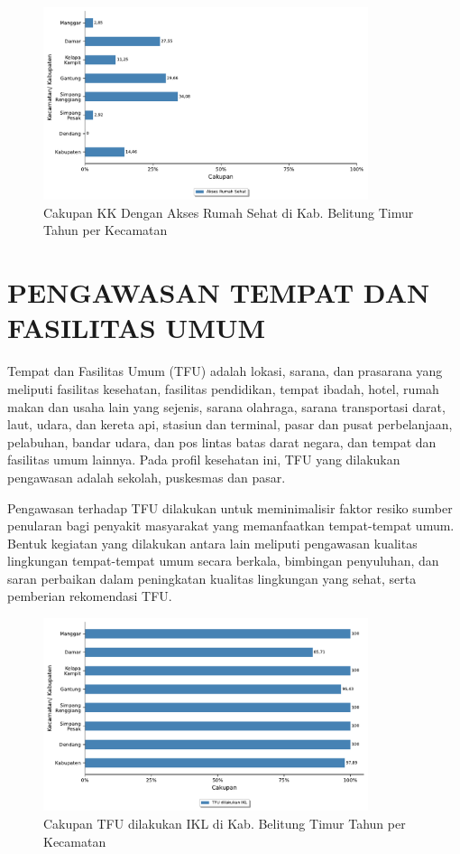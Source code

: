 \begin{figure}[H]
	\centering
	\includegraphics[width=0.85\textwidth]{bab_07/bab_07_03b_aksesRumahSehat}
	\caption{Cakupan KK Dengan Akses Rumah Sehat di Kab. Belitung Timur Tahun \tP per Kecamatan}
	\label{fig:Cakupan-KK-Rumah-Sehat}
\end{figure}

\section{PENGAWASAN TEMPAT DAN FASILITAS UMUM}
Tempat dan Fasilitas Umum (TFU) adalah lokasi, sarana, dan prasarana yang meliputi fasilitas kesehatan, fasilitas pendidikan, tempat ibadah, hotel, rumah makan dan usaha lain yang sejenis, sarana olahraga, sarana transportasi darat, laut, udara, dan kereta api, stasiun dan terminal, pasar dan pusat perbelanjaan, pelabuhan, bandar udara, dan pos lintas batas darat negara, dan tempat dan fasilitas umum lainnya. Pada profil kesehatan ini, TFU yang dilakukan pengawasan adalah sekolah, puskesmas dan pasar.

Pengawasan terhadap TFU dilakukan untuk meminimalisir faktor resiko sumber penularan bagi penyakit masyarakat yang memanfaatkan tempat-tempat umum.
Bentuk kegiatan yang dilakukan antara lain meliputi pengawasan kualitas lingkungan tempat-tempat umum secara berkala, bimbingan penyuluhan, dan saran perbaikan dalam peningkatan kualitas lingkungan yang sehat, serta pemberian rekomendasi TFU.

\begin{figure}[H]
    \centering
    \includegraphics[width=0.85\textwidth]{bab_07/bab_07_04_TFUIKL}
    \caption{Cakupan TFU dilakukan IKL di Kab. Belitung Timur Tahun \tP per Kecamatan}
    \label{fig:Cakupan-TFU-IKL}
\end{figure}

